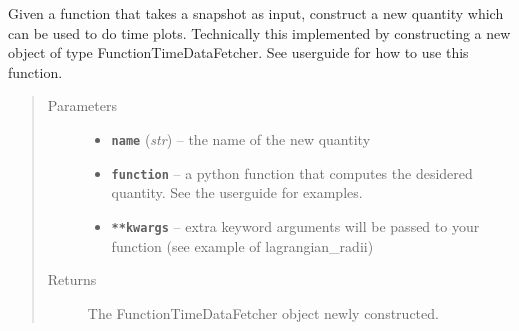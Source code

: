 \documentclass[letterpaper,10pt,english]{sphinxmanual}
\begin{document}

\begin{fulllineitems}
\label{index:facade.CreateTimeData}
Given a function that takes a snapshot as input, construct a new
quantity which can be used to do time plots. Technically this implemented
by constructing a new object of type FunctionTimeDataFetcher. See userguide
for how to use this function.
\begin{quote}\begin{description}
\item[{Parameters}] \leavevmode\begin{itemize}
\item {} 
\textbf{\texttt{name}} (\emph{str}) -- the name of the new quantity

\item {} 
\textbf{\texttt{function}} -- a python function that computes the desidered quantity. See the
userguide for examples.

\item {} 
\textbf{\texttt{**kwargs}} -- extra keyword arguments will be passed to your function (see
example of lagrangian\_radii)

\end{itemize}

\item[{Returns}] \leavevmode
The FunctionTimeDataFetcher object newly constructed.

\end{description}\end{quote}

\end{fulllineitems}

\end{document}
